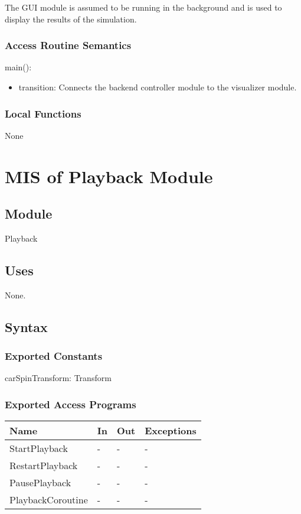 \documentclass[12pt, titlepage]{article}
\begin{document}
The GUI module is assumed to be running in the background and is used to display the results of the simulation.

\subsubsection{Access Routine Semantics}

\noindent main():
\begin{itemize}
\item transition: Connects the backend controller module to the visualizer module.
\end{itemize}


\subsubsection{Local Functions}

None

\newpage

\section{MIS of Playback Module} \label{Module_playback} 


\subsection{Module}

Playback

\subsection{Uses}
None.

\subsection{Syntax}

\subsubsection{Exported Constants}
carSpinTransform: Transform

\subsubsection{Exported Access Programs}

\begin{center}
\begin{tabular}{p{4cm} p{4cm} p{4cm} p{2cm}}
\hline
\textbf{Name} & \textbf{In} & \textbf{Out} & \textbf{Exceptions} \\
\hline
StartPlayback & - & - & - \\
RestartPlayback & - & - & - \\
PausePlayback & - & - & - \\
PlaybackCoroutine & - & - & - \\
\hline
\end{tabular}
\end{center}
\end{document}
